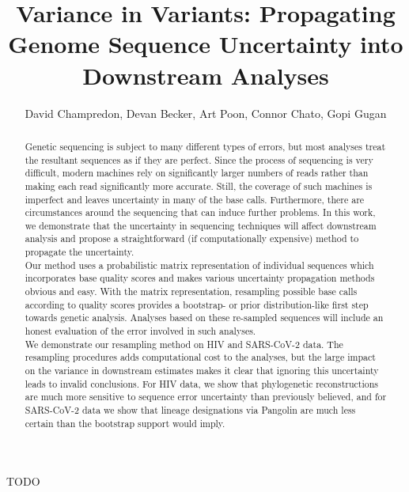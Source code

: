 \documentclass[
]{article}
\title{Variance in Variants: Propagating Genome Sequence Uncertainty
into Downstream Analyses}
\author{David Champredon, Devan Becker, Art Poon, Connor Chato, Gopi
Gugan}
\date{}
\begin{document}
\maketitle
\begin{abstract}
Genetic sequencing is subject to many different types of errors, but
most analyses treat the resultant sequences as if they are perfect.
Since the process of sequencing is very difficult, modern machines rely
on significantly larger numbers of reads rather than making each read
significantly more accurate. Still, the coverage of such machines is
imperfect and leaves uncertainty in many of the base calls. Furthermore,
there are circumstances around the sequencing that can induce further
problems. In this work, we demonstrate that the uncertainty in
sequencing techniques will affect downstream analysis and propose a
straightforward (if computationally expensive) method to propagate the
uncertainty.\\
Our method uses a probabilistic matrix representation of individual
sequences which incorporates base quality scores and makes various
uncertainty propagation methods obvious and easy. With the matrix
representation, resampling possible base calls according to quality
scores provides a bootstrap- or prior distribution-like first step
towards genetic analysis. Analyses based on these re-sampled sequences
will include an honest evaluation of the error involved in such
analyses.\\
We demonstrate our resampling method on HIV and SARS-CoV-2 data. The
resampling procedures adds computational cost to the analyses, but the
large impact on the variance in downstream estimates makes it clear that
ignoring this uncertainty leads to invalid conclusions. For HIV data, we
show that phylogenetic reconstructions are much more sensitive to
sequence error uncertainty than previously believed, and for SARS-CoV-2
data we show that lineage designations via Pangolin are much less
certain than the bootstrap support would imply.
\end{abstract}

TODO
\end{document}
